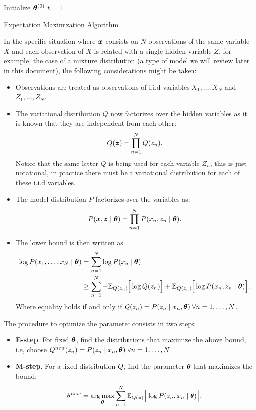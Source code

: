  \begin{algorithm}[t]
  \SetAlgoLined{}
  Initialize \(\bm{\theta}^{(0)}\)\;
  \(t=1\)\;
  \KwRet{\(\theta\)}\;
  \caption{Expectation Maximization Algorithm}\label{alg:em}
\end{algorithm}

In the specific situation where \(\bm{x}\) consists on \(N\) observations of the same variable \(X\) and each observation of \(X\) is related with a single hidden variable \(Z\), for example, the case of a mixture distribution (a type of model we will review later in this document), the following considerations might be taken:
\begin{itemize}\setlength{\itemsep}{0.2cm}
  \item Observations are treated as observations of i.i.d variables \(X_{1},\dots, X_{N}\) and \(Z_{1},\dots,Z_{N}\).
  \item The variational distribution \(Q\) now factorizes over the hidden variables as it is known that they are independent from each other:
    \[
    Q(\bm{z}) = \prod_{n=1}^{N}Q(z_{n}).
    \]
    Notice that the same letter \(Q\) is being used for each variable \(Z_{n}\), this is just notational, in practice there must be a variational distribution for each of these i.i.d variables.
  \item The model distribution \(P\) factorizes over the variables as:
    \[
    P(\bm{x}, \bm{z} \mid \bm{\theta}) = \prod_{n=1}^{N}P(x_{n}, z_{n} \mid \bm{\theta}).
    \]
  \item The lower bound is then written as
    \[
    \begin{aligned}
      \log{P(x_{1},\dots,x_{N} \mid \bm{\theta})} &= \sum_{n=1}^{N}\log{P(x_{n} \mid \bm{\theta})}\\
      &\geq \sum_{n = 1}^{N} -\mathbb{E}_{Q(z_{n})}\Big[\log{Q(z_{n})}\Big] + \mathbb{E}_{Q(z_{n})}\Big[\log{P(x_{n},z_{n} \mid \bm{\theta})}\Big].
    \end{aligned}
    \]
    Where equality holds if and only if \(Q(z_{n}) = P(z_{n} \mid x_{n} , \bm{\theta}) \ \forall n=1, \dots, N\).
\end{itemize}

The procedure to optimize the parameter consists in two steps:
\begin{itemize}\setlength{\itemsep}{0.2cm}
  \item \textbf{E-step}. For fixed \(\bm{\theta}\), find the distributions that maximize the above bound, i.e, choose \(Q^{new}(z_{n}) = P(z_{n} \mid x_{n} , \btheta) \ \forall n = 1,\dots,N\).
  \item \textbf{M-step}. For a fixed distribution \(Q\), find the parameter \(\bm{\theta}\) that maximizes the bound:
    \[
    \theta^{new} = \operatorname*{arg\,max}_{\bm{\theta}}\sum_{n=1}^{N}\mathbb{E}_{Q(\bm{z})}\Big[\log{P(z_{n}, x_{n} \mid \bm{\theta})}\Big].
    \]
\end{itemize}

